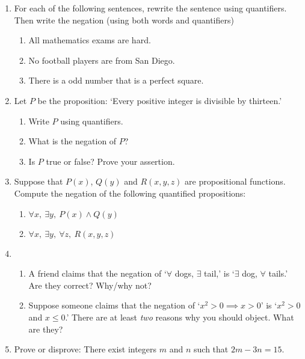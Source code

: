 \begin{enumerate}\renewcommand{\labelenumi}{\thesubsection.\theenumi}
	\item For each of the following sentences, rewrite the sentence using quantifiers. Then write the negation (using both words and quantifiers)\prelistskip
		\begin{enumerate}
		  \item All mathematics exams are hard.
	  	\item No football players are from San Diego.
	  	\item There is a odd number that is a perfect square.
		\end{enumerate}
		
	\item Let $P$ be the proposition: `Every positive integer is divisible by thirteen.'\prelistskip
    \begin{enumerate}
      \item Write $P$ using quantifiers.
      \item What is the negation of $P$?
      \item Is $P$ true or false? Prove your assertion.
    \end{enumerate}
    
  \item Suppose that $P(x)$, $Q(y)$ and $R(x,y,z)$ are propositional functions. Compute the negation of the following quantified propositions:
  \begin{enumerate}
    \item $\forall x,\ \exists y,\ P(x)\wedge Q(y)$
    \item $\forall x,\ \exists y,\ \forall z,\ R(x,y,z)$
  \end{enumerate}
  
  \item\begin{enumerate}
  	\item A friend claims that the negation of `$\forall$ dogs, $\exists$ tail,' is `$\exists$ dog, $\forall$ tails.' Are they correct? Why/why not?
    \item Suppose someone claims that the negation of `$x^2>0\implies x>0$' is `$x^2>0$ and $x\le 0$.' There are at least \emph{two} reasons why you should object. What are they?
  \end{enumerate} 
		
	\item Prove or disprove: There exist integers $m$ and $n$ such that $2m-3n=15$. 


\end{enumerate}
